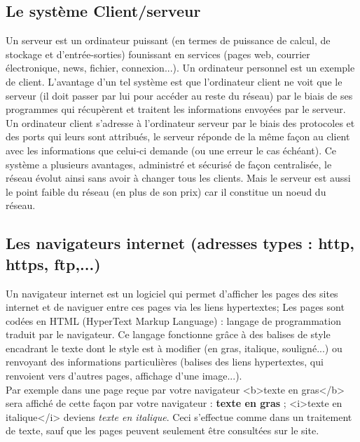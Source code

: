 \documentclass[11pt,twoside,a4paper]{article}
\begin{document}
	\subsection{Le syst{\`e}me Client/serveur}

			Un serveur est un ordinateur puissant (en termes de puissance de calcul, de stockage et d'entr{\'e}e-sorties) founissant en services (pages web, courrier {\'e}lectronique, news, fichier, connexion...). Un ordinateur personnel est un exemple de client. L'avantage d'un tel syst{\`e}me est que l'ordinateur client ne voit que le serveur (il doit passer par lui pour acc{\'e}der au reste du r{\'e}seau) par le biais de ses programmes qui r{\'e}cup{\`e}rent et traitent les informations envoy{\'e}es par le serveur. ~\\

			Un ordinateur client s'adresse {\`a} l'ordinateur serveur par le biais des protocoles et des ports qui leurs sont attribu{\'e}s, le serveur r{\'e}ponde de la m{\^e}me fa\c{c}on au client avec les informations que celui-ci demande (ou une erreur le cas {\'e}ch{\'e}ant). Ce syst{\`e}me a plusieurs avantages, administr{\'e} et s{\'e}curis{\'e} de fa\c{c}on centralis{\'e}e, le r{\'e}seau {\'e}volut ainsi sans avoir {\`a} changer tous les clients. Mais le serveur est aussi le point faible du r{\'e}seau (en plus de son prix) car il constitue un noeud du r{\'e}seau. ~\\

	\subsection{Les navigateurs internet (adresses types : http, https, ftp,...)}

			Un navigateur internet est un logiciel qui permet d'afficher les pages des sites internet et de naviguer entre ces pages via les liens hypertextes; Les pages sont cod{\'e}es en HTML (HyperText Markup Language) : langage de programmation traduit par le navigateur. Ce langage fonctionne gr{\^a}ce {\`a} des balises de style encadrant le texte dont le style est {\`a} modifier (en gras, italique, soulign{\'e}...) ou renvoyant des informations particuli{\`e}res (balises des liens hypertextes, qui renvoient vers d'autres pages, affichage d'une image...). ~\\

		Par exemple dans une page re\c{c}ue par votre navigateur <b>texte en gras</b> sera affich{\'e} de cette fa\c{c}on par votre navigateur : \textbf{texte en gras} ; <i>texte en italique</i> deviens \textit{texte en italique}. Ceci s'effectue comme dans un traitement de texte, sauf que les pages peuvent seulement {\^e}tre consult{\'e}es sur le site. ~\\
\end{document}
